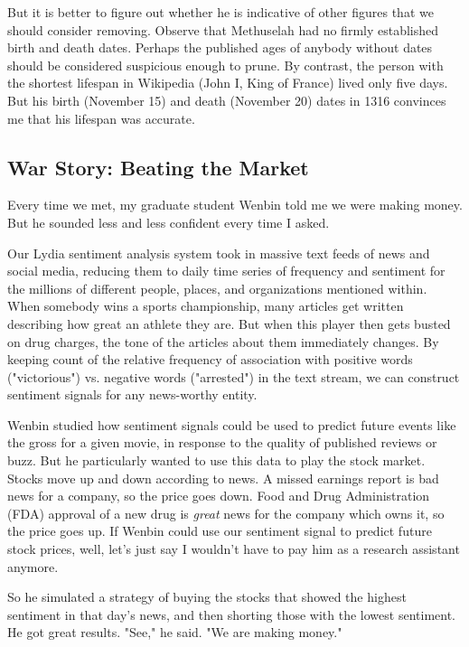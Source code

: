 \documentclass[10pt]{article}
\begin{document}
But it is better to figure out whether he is indicative of other figures that we should consider removing. Observe that Methuselah had no firmly established birth and death dates. Perhaps the published ages of anybody without dates should be considered suspicious enough to prune. By contrast, the person with the shortest lifespan in Wikipedia (John I, King of France) lived only five days. But his birth (November 15) and death (November 20) dates in 1316 convinces me that his lifespan was accurate.

\subsection{War Story: Beating the Market}

Every time we met, my graduate student Wenbin told me we were making money. But he sounded less and less confident every time I asked.

Our Lydia sentiment analysis system took in massive text feeds of news and social media, reducing them to daily time series of frequency and sentiment for the millions of different people, places, and organizations mentioned within. When somebody wins a sports championship, many articles get written describing how great an athlete they are. But when this player then gets busted on drug charges, the tone of the articles about them immediately changes. By keeping count of the relative frequency of association with positive words ("victorious") vs. negative words ("arrested") in the text stream, we can construct sentiment signals for any news-worthy entity.

Wenbin studied how sentiment signals could be used to predict future events like the gross for a given movie, in response to the quality of published reviews or buzz. But he particularly wanted to use this data to play the stock market. Stocks move up and down according to news. A missed earnings report is bad news for a company, so the price goes down. Food and Drug Administration (FDA) approval of a new drug is \textit{great} news for the company which owns it, so the price goes up. If Wenbin could use our sentiment signal to predict future stock prices, well, let's just say I wouldn't have to pay him as a research assistant anymore.

So he simulated a strategy of buying the stocks that showed the highest
sentiment in that day's news, and then shorting those with the lowest sentiment. He got great results. "See," he said. "We are making money."
\end{document}
